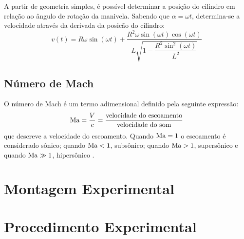 A partir de geometria simples, é possível determinar a posição do cilindro em relação ao ângulo de rotação da manivela. Sabendo que $\alpha=\omega t$, determina-se a velocidade através da derivada da posicão do cilindro:
%
\begin{equation}
    v(t) = R \omega \sin{\left(\omega t \right)} + \frac{R^{2} \omega \sin{\left(\omega t \right)} \cos{\left(\omega t \right)}}{L \sqrt{1 - \dfrac{R^{2} \sin^{2}{\left(\omega t \right)}}{L^{2}}}}
    \label{eq:velocidade}
\end{equation}

\subsection{Número de Mach}

O número de Mach é um termo adimensional definido pela seguinte expressão:
%
\begin{equation}
    \text{Ma} = \frac{V}{c} = \frac{\text{velocidade do escoamento}}{\text{velocidade do som}}
    \label{eq:mach}
\end{equation}
%
que descreve a velocidade do escoamento. Quando $\text{Ma} = 1$ o escoamento é considerado sônico; quando $\text{Ma} < 1$, subsônico; quando $\text{Ma} > 1$, supersônico e quando $\text{Ma} \gg 1$, hipersônico \cite{cengel2015mecanica}.
\section{Montagem Experimental}

\section{Procedimento Experimental}